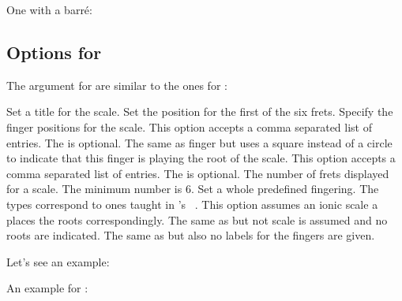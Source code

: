 \documentclass[load-preamble+]{cnltx-doc}
\begin{document}
One with a barr\'e:

\begin{example}
  \chordscheme[
    name      = Gmi\textsuperscript{7} ,
    position  = II ,
    barre     = 2/2-4:3 ,
    show-root = 4/4 ,
    root      = 2/6:2 ,
    mute      = {1,5}
  ]
\end{example}

\subsection{Options for }
The  argument for  are similar to the ones for
:
\begin{options}
    Set a title for the scale.
    Set the position for the first of the six frets.
    Specify the finger positions for the scale.  This option accepts a comma
    separated list of entries.  The  is optional.
    The same as finger but uses a square instead of a circle to indicate that
    this finger is playing the root of the scale.  This option accepts a comma
    separated list of entries.  The  is optional.
    The number of frets displayed for a scale.  The minimum number is 6.
    Set a whole predefined fingering.  The types correspond to ones taught
    in \citeauthor{leavitt:mmfg:1}'s
    ~\cite{leavitt:mmfg:1}.  This option assumes an
    ionic scale a places the roots correspondingly.
    The same as  but not scale is assumed and no roots are
    indicated.
    The same as  but also no labels for the fingers are given.
\end{options}

Let's see an example:
\begin{example}
  \scales[
    name      = F-major (Fingering Type~1A) ,
    position  = I ,
    fingering = type 1A
  ]
\end{example}

An example for :
\begin{example}
  \scales[
    name       = Fingering Type~3 ,
    fingering* = type 3
  ]
\end{example}
\end{document}
